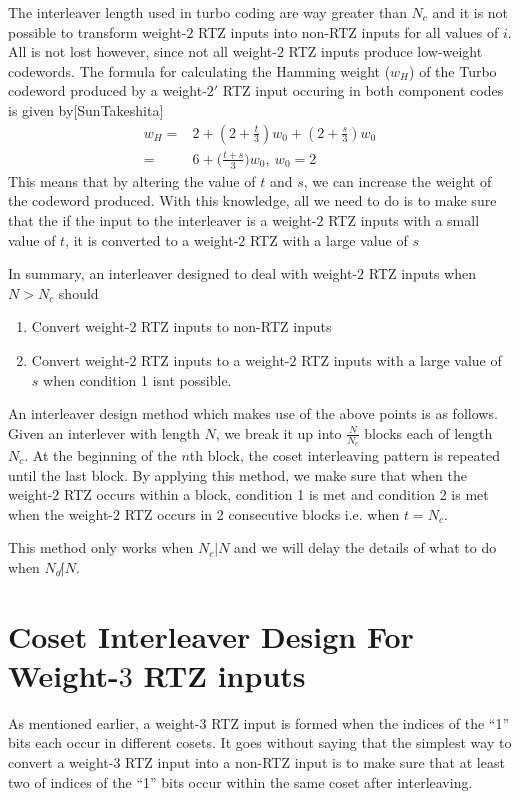 \documentclass[11pt, oneside, dvipdfmx]{book}
\begin{document}
The interleaver length used in turbo coding are way greater than $N_c$ and it is not possible to transform weight-$2$ RTZ inputs into non-RTZ inputs for all values of $i$. All is not lost however, since not all weight-$2$ RTZ inputs produce low-weight codewords. 
The formula for calculating the Hamming weight ($w_H$) of the Turbo codeword produced by a weight-$2'$ RTZ input occuring in both component codes is given by[SunTakeshita] 
\begin{equation}
\begin{split}
w_H=&2+(2 + \frac{t}{3} )w_0+ (2 + \frac{s}{3})w_0\\
=&6+\Big(\frac{t+s}{3}\Big)w_0,~w_0=2
\end{split}
\label{eq3}
\end{equation}
This means that by altering the value of $t$ and $s$, we can increase the weight of the codeword produced. With this knowledge,
all we need to do is to make sure that the if the input to the interleaver is a weight-$2$ RTZ inputs with a small value of $t$, it is converted to a weight-$2$ RTZ with a large value of $s$

In summary, an interleaver designed to deal with weight-$2$ RTZ inputs when $N>N_c$ should
\begin{enumerate}
\item Convert  weight-$2$ RTZ inputs to non-RTZ inputs

\item Convert  weight-$2$ RTZ inputs to a weight-$2$ RTZ inputs with a large value of $s$ when condition 1 isnt possible.

\end{enumerate}

An interleaver design method which makes use of the above points is as follows.
Given an interlever with length $N$, we break it up into $\frac{N}{N_c}$ blocks each of length $N_c$. At the beginning of the $n$th block, the coset interleaving pattern is repeated until the last block. By applying this method, we make sure that when the weight-$2$ RTZ occurs within a  block, condition 1 is met and condition 2 is met when the weight-$2$ RTZ occurs in 2 consecutive blocks i.e. when  $t=N_c$.

This method only works when $N_c | N$ and we will delay the details of what to do when $N_c \not| N$.

\section{Coset Interleaver Design For Weight-$3$ RTZ inputs}
As mentioned earlier, a weight-$3$ RTZ input is formed when the indices of the ``1'' bits each occur in different cosets.  It goes without saying that the simplest way to convert a weight-$3$ RTZ input into a non-RTZ input is to make sure that at least two of indices of the ``1'' bits occur within the same coset after interleaving.
\end{document}

